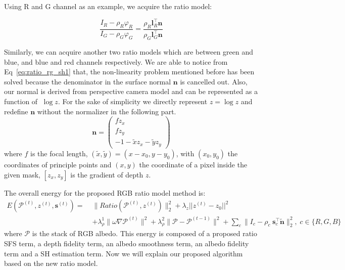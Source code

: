 Using R and G channel as an example, we acquire the ratio model:

\begin{equation}\label{eq:ratio_rg_sh1}
\frac{I_R - \rho_R \varphi_R}{I_G - \rho_G \varphi_G} = \frac{\rho_R \mathbf{l}_R^\top \mathbf{n}}{\rho_G \mathbf{l}_G^\top \mathbf{n}}
\end{equation}

Similarly, we can acquire another two ratio models which are between green and blue, and blue and red channels respectively.
We are able to notice from Eq~\ref{eq:ratio_rg_sh1} that, the non-linearity problem mentioned before has been solved because the denominator in the surface normal $\mathbf{n}$ is cancelled out.
Also, our normal is derived from perspective camera model and can be represented as a function of $\; \log z$. 
For the sake of simplicity we directly represent $z = \log z$ and redefine $\mathbf{n}$ without the normalizer in the following part.
\begin{equation}\label{eq:ratio_normal}
    \mathbf{n} =
     \begin{pmatrix}
         fz_x\\
         fz_y\\
         -1 - \tilde{x}z_x - \tilde{y}z_y
     \end{pmatrix}
\end{equation}
where $f$ is the focal length, $(\tilde{x}, \tilde{y}) = (x- x_0, y - y_0)$, with $(x_0, y_0)$ the coordinates of principle points and $(x,y)$ the coordinate of a pixel inside the given mask, $[z_x, z_y]$ is the gradient of depth $z$.

The overall energy for the proposed RGB ratio model method is:
\begin{equation}\label{eq:ratio_energy}
    \begin{split}
	E(\mathcal{P}^{(t)}, z^{(t)}, \mathbf{s}^{(t)}) = \; &\lVert Ratio(\mathcal{P}^{(t)}, z^{(t)}) \rVert^2_2 
	+ \lambda_z||z^{(t)} - z_0||^2 \\&
	+ \lambda_{\rho}^1 \lVert \omega \nabla \mathcal{P}^{(t)} \rVert^2  
	+ \lambda_{\rho}^2 \lVert \mathcal{P} - \mathcal{P}^{(t-1)}\rVert^2 
	+ \sum_{c} \lVert I_c - \rho_c \; \mathbf{s}_c^\top \tilde{\mathbf{n}} \rVert^2_2, \; c\in\{R,G,B\}
    \end{split}
\end{equation}
where $\mathcal{P}$ is the stack of RGB albedo.
This energy is composed of a proposed ratio SFS term, a depth fidelity term, an albedo smoothness term, an albedo fidelity term and a SH estimation term.
Now we will explain our proposed algorithm based on the new ratio model.

